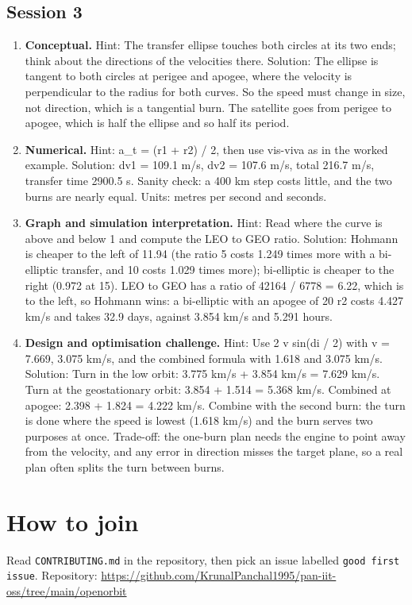 \documentclass[11pt,a4paper]{article}
\begin{document}
\subsection*{Session 3}
\begin{enumerate}[nosep]
\item \textbf{Conceptual.} Hint: The transfer ellipse touches both circles at its two ends; think about the directions of the velocities there. Solution: The ellipse is tangent to both circles at perigee and apogee, where the velocity is perpendicular to the radius for both curves. So the speed must change in size, not direction, which is a tangential burn. The satellite goes from perigee to apogee, which is half the ellipse and so half its period.
\item \textbf{Numerical.} Hint: a\_t = (r1 + r2) / 2, then use vis-viva as in the worked example. Solution: dv1 = 109.1 m/s, dv2 = 107.6 m/s, total 216.7 m/s, transfer time 2900.5 s. Sanity check: a 400 km step costs little, and the two burns are nearly equal. Units: metres per second and seconds.
\item \textbf{Graph and simulation interpretation.} Hint: Read where the curve is above and below 1 and compute the LEO to GEO ratio. Solution: Hohmann is cheaper to the left of 11.94 (the ratio 5 costs 1.249 times more with a bi-elliptic transfer, and 10 costs 1.029 times more); bi-elliptic is cheaper to the right (0.972 at 15). LEO to GEO has a ratio of 42164 / 6778 = 6.22, which is to the left, so Hohmann wins: a bi-elliptic with an apogee of 20 r2 costs 4.427 km/s and takes 32.9 days, against 3.854 km/s and 5.291 hours.
\item \textbf{Design and optimisation challenge.} Hint: Use 2 v sin(di / 2) with v = 7.669, 3.075 km/s, and the combined formula with 1.618 and 3.075 km/s. Solution: Turn in the low orbit: 3.775 km/s + 3.854 km/s = 7.629 km/s. Turn at the geostationary orbit: 3.854 + 1.514 = 5.368 km/s. Combined at apogee: 2.398 + 1.824 = 4.222 km/s. Combine with the second burn: the turn is done where the speed is lowest (1.618 km/s) and the burn serves two purposes at once. Trade-off: the one-burn plan needs the engine to point away from the velocity, and any error in direction misses the target plane, so a real plan often splits the turn between burns.
\end{enumerate}

\section{How to join}
Read \texttt{CONTRIBUTING.md} in the repository, then pick an issue labelled \texttt{good first issue}. Repository: \url{https://github.com/KrunalPanchal1995/pan-iit-oss/tree/main/openorbit}
\end{document}
